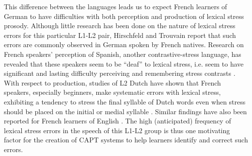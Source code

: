 \documentclass[a4paper]{article}
\begin{document}
This difference between the languages leads us to expect French learners of German to have difficulties with both perception and production of lexical stress prosody.
Although little research has been done on the nature of lexical stress errors for this particular L1-L2 pair, Hirschfeld and Trouvain \cite{Hirschfeld2007} report that such errors are commonly observed in German spoken by French natives.
Research on French speakers' perception of Spanish, another contrastive-stress language, has revealed that these speakers seem to be ``deaf'' to lexical stress, i.e. seem to have significant and lasting difficulty perceiving and remembering stress contrasts \cite{Dupoux2008}. 
With respect to production, studies of L2 Dutch have shown that French speakers, especially beginners, make systematic errors with lexical stress, exhibiting a tendency to stress the final syllable of Dutch words even when stress should be placed on the initial or medial syllable \cite{Michaux2012,Michaux2013}. Similar findings have also been reported for French learners of English \cite{Bonneau2011}.
%
	The high (anticipated) frequency of lexical stress errors in the speech of this L1-L2 group is thus one motivating factor for the creation of CAPT systems to help learners identify and correct such errors. 
	
\end{document}
